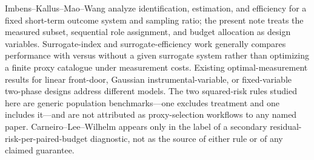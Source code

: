Imbens--Kallus--Mao--Wang analyze identification, estimation, and efficiency for a fixed short-term outcome system and sampling ratio; the present note treats the measured subset, sequential role assignment, and budget allocation as design variables.  Surrogate-index and surrogate-efficiency work generally compares performance with versus without a given surrogate system rather than optimizing a finite proxy catalogue under measurement costs.  Existing optimal-measurement results for linear front-door, Gaussian instrumental-variable, or fixed-variable two-phase designs address different models.  The two squared-risk rules studied here are generic population benchmarks---one excludes treatment and one includes it---and are not attributed as proxy-selection workflows to any named paper.  Carneiro--Lee--Wilhelm appears only in the label of a secondary residual-risk-per-paired-budget diagnostic, not as the source of either rule or of any claimed guarantee.